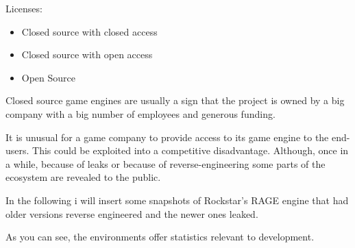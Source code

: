 








        Licenses:

        \begin{itemize}
            \item Closed source with closed access
            \item Closed source with open access
            \item Open Source
        \end{itemize}

        Closed source game engines are usually a sign that the project is owned by a big company with a big number of employees and generous funding.
        
        It is unusual for a game company to provide access to its game engine to the end-users. This could be exploited into a competitive disadvantage.
        Although, once in a while, because of leaks or because of reverse-engineering some parts of the ecosystem are revealed to the public.

        In the following i will insert some snapshots of Rockstar's RAGE engine that had older versions reverse engineered and the newer ones leaked. 
        

        As you can see, the environments offer statistics relevant to development.

